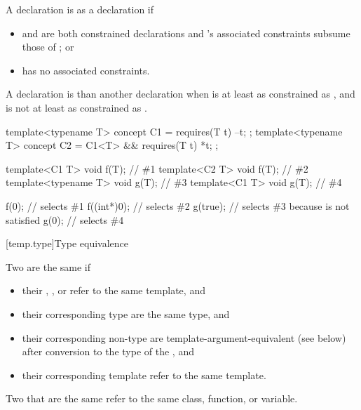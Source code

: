 \pnum
A declaration  is
 as
a declaration  if
\begin{itemize}
\item {} and  are both constrained declarations and
's associated constraints subsume those of ; or

\item {} has no associated constraints.
\end{itemize}

\pnum
A declaration  is 
than another declaration  when  is at least as
constrained as , and  is not at least as
constrained as .
\begin{example}
\begin{codeblock}
template<typename T> concept C1 = requires(T t) { --t; };
template<typename T> concept C2 = C1<T> && requires(T t) { *t; };

template<C1 T> void f(T);       // \#1
template<C2 T> void f(T);       // \#2
template<typename T> void g(T); // \#3
template<C1 T> void g(T);       // \#4

f(0);                           // selects \#1
f((int*)0);                     // selects \#2
g(true);                        // selects \#3 because  is not satisfied
g(0);                           // selects \#4
\end{codeblock}
\end{example}

[temp.type]{Type equivalence}

\pnum
{}%
Two  are the same if
\begin{itemize}
\item
their ,
, or
refer to the same template, and

\item
their corresponding type 
are the same type, and

\item
their corresponding non-type 
are template-argument-equivalent (see below)
after conversion to the type of the , and

\item
their corresponding template 
refer to the same template.
\end{itemize}
Two  that are the same
refer to the same class, function, or variable.

